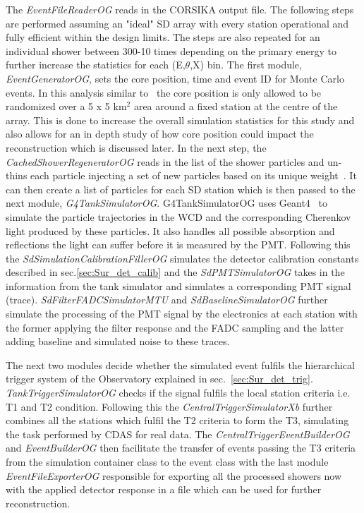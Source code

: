 The \textit{EventFileReaderOG} reads in the CORSIKA output file. The following steps are performed assuming an "ideal" SD array with every station operational and fully efficient within the design limits. The steps are also repeated for an individual shower between 300-10 times depending on the primary energy to further increase the statistics for each (E,$\theta$,X) bin. The first module, \textit{EventGeneratorOG}, sets the core position, time and event ID for Monte Carlo events. In this analysis similar to~\cite{gap_note_2013} the core position is only allowed to be randomized over a 5 x 5 km$^2$ area around a fixed station at the centre of the array. This is done to increase the overall simulation statistics for this study and also allows for an in depth study of how core position could impact the reconstruction which is discussed later. In the next step, the \textit{CachedShowerRegeneratorOG} reads in the list of the shower particles and un-thins each particle injecting a set of new particles based on its unique weight~\cite{Stokes:2011wf}. It can then create a list of particles for each SD station which is then passed to the next module, \textit{G4TankSimulatorOG}. G4TankSimulatorOG uses Geant4~\cite{GEANT4:2002zbu,Allison:2006ve,Allison:2016lfl} to simulate the particle trajectories in the WCD and the corresponding Cherenkov light produced by these particles. It also handles all possible absorption and reflections the light can suffer before it is measured by the PMT. Following this the \textit{SdSimulationCalibrationFillerOG} simulates the detector calibration constants described in sec.\ref{sec:Sur_det_calib} and the \textit{SdPMTSimulatorOG} takes in the information from the tank simulator and simulates a corresponding PMT signal (trace). \textit{SdFilterFADCSimulatorMTU} and \textit{SdBaselineSimulatorOG} further simulate the processing of the PMT signal by the electronics at each station with the former applying the filter response and the FADC sampling and the latter adding baseline and simulated noise to these traces. 

The next two modules decide whether the simulated event fulfils the hierarchical trigger system of the Observatory explained in sec.~\ref{sec:Sur_det_trig}. \textit{TankTriggerSimulatorOG} checks if the signal fulfils the local station criteria i.e. T1 and T2 condition. Following this the \textit{CentralTriggerSimulatorXb} further combines all the stations which fulfil the T2 criteria to form the T3, simulating the task performed by CDAS for real data. The \textit{CentralTriggerEventBuilderOG} and \textit{EventBuilderOG} then facilitate the transfer of events passing the T3 criteria from the simulation container class to the event class with the last module \textit{EventFileExporterOG} responsible for exporting all the processed showers now with the applied detector response in a file which can be used for further reconstruction.  


